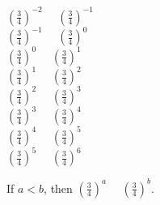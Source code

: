 \documentclass{ximera}
\author{Lee Wayand}
\begin{document}
\begin{example}


\begin{question}


$\left( \frac{3}{4} \right)^{-2}$ \, \wordChoice{\choice{$<$} \choice[correct]{$>$}} \, $\left( \frac{3}{4} \right)^{-1}$  \\

$\left( \frac{3}{4} \right)^{-1}$ \, \wordChoice{\choice{$<$} \choice[correct]{$>$}} \, $\left( \frac{3}{4} \right)^{0}$  \\

$\left( \frac{3}{4} \right)^{0}$ \, \wordChoice{\choice{$<$} \choice[correct]{$>$}} \, $\left( \frac{3}{4} \right)^{1}$  \\

$\left( \frac{3}{4} \right)^{1}$ \, \wordChoice{\choice{$<$} \choice[correct]{$>$}} \, $\left( \frac{3}{4} \right)^{2}$  \\

$\left( \frac{3}{4} \right)^{2}$ \, \wordChoice{\choice{$<$} \choice[correct]{$>$}} \, $\left( \frac{3}{4} \right)^{3}$  \\

$\left( \frac{3}{4} \right)^{3}$ \, \wordChoice{\choice{$<$} \choice[correct]{$>$}} \, $\left( \frac{3}{4} \right)^{4}$  \\

$\left( \frac{3}{4} \right)^{4}$ \, \wordChoice{\choice{$<$} \choice[correct]{$>$}} \, $\left( \frac{3}{4} \right)^{5}$  \\

$\left( \frac{3}{4} \right)^{5}$ \, \wordChoice{\choice{$<$} \choice[correct]{$>$}} \, $\left( \frac{3}{4} \right)^{6}$  \\


\end{question}




\begin{question}



If $a < b$, then $\left( \frac{3}{4} \right)^{a}$ \, \wordChoice{\choice{$<$} \choice[correct]{$>$}} \, $\left( \frac{3}{4} \right)^{b}$.  \\



\end{question}





\begin{question}




\end{question}
\end{example}
\end{document}
